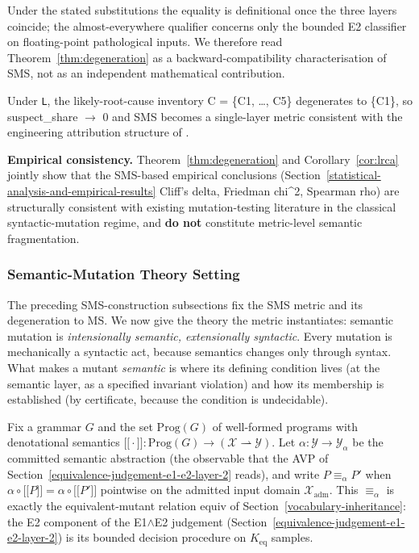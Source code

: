 \documentclass[manuscript,screen,review]{acmart}
\begin{document}
Under the stated substitutions the equality is definitional once the
three layers coincide; the almost-everywhere qualifier concerns only
the bounded E2 classifier on floating-point pathological inputs. We
therefore read Theorem~\ref{thm:degeneration} as a
backward-compatibility characterisation of SMS, not as an independent
mathematical contribution.

\begin{corollary}\label{cor:lrca}
Under \texttt{L}, the
likely-root-cause inventory C = \{C1, \ldots, C5\} degenerates to
\{C1\}, so suspect\_share $\to$ 0 and SMS becomes a single-layer metric
consistent with the engineering attribution structure of
\citet{d7c38286734419b52de4262c9802ebdfcf4b9447}.
\end{corollary}

\textbf{Empirical consistency.} Theorem~\ref{thm:degeneration} and
Corollary~\ref{cor:lrca} jointly
show that the SMS-based empirical conclusions (Section~\ref{statistical-analysis-and-empirical-results} Cliff's delta,
Friedman chi\^{}2, Spearman rho) are structurally consistent with
existing mutation-testing literature in the classical syntactic-mutation
regime, and \textbf{do not} constitute metric-level semantic
fragmentation.


\subsubsection{Semantic-Mutation Theory Setting}\label{theory-setting}

The preceding SMS-construction subsections fix the SMS metric and its degeneration to MS. We now
give the theory the metric instantiates: semantic mutation is
\emph{intensionally semantic, extensionally syntactic}. Every mutation
is mechanically a syntactic act, because semantics changes only through
syntax. What makes a mutant \emph{semantic} is where its defining
condition lives (at the semantic layer, as a specified invariant
violation) and how its membership is established (by certificate,
because the condition is undecidable).

Fix a grammar $G$ and the set $\mathrm{Prog}(G)$ of well-formed programs
with denotational semantics
$\mathopen{\lbrack\!\lbrack}\cdot\mathclose{\rbrack\!\rbrack} : \mathrm{Prog}(G) \to (\mathcal{X} \rightharpoonup \mathcal{Y})$.
Let $\alpha : \mathcal{Y} \to \mathcal{Y}_\alpha$ be the committed
semantic abstraction (the observable that the AVP of Section~\ref{equivalence-judgement-e1-e2-layer-2} reads), and
write $P \equiv_\alpha P'$ when
$\alpha \circ \mathopen{\lbrack\!\lbrack} P \mathclose{\rbrack\!\rbrack} = \alpha \circ \mathopen{\lbrack\!\lbrack} P' \mathclose{\rbrack\!\rbrack}$
pointwise on the admitted input domain $\mathcal{X}_{\mathrm{adm}}$.
This $\equiv_\alpha$ is exactly the equivalent-mutant relation
$\mathrm{equiv}$ of Section~\ref{vocabulary-inheritance}: the E2 component of the E1$\wedge$E2 judgement
(Section~\ref{equivalence-judgement-e1-e2-layer-2}) is its bounded decision procedure on $K_{\mathrm{eq}}$ samples.
\end{document}
